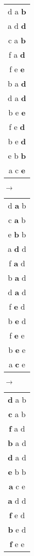 \documentclass[sigplan,10pt,anonymous,review]{thesis}
\begin{document}
\begin{figure}[!hb]
  \centering
  \begin{tt}
    \begin{tabular}{c}
      d a \textbf{b} \\
      a d \textbf{d} \\
      c a \textbf{b} \\
      f a \textbf{d} \\
      f e \textbf{e} \\
      b a \textbf{d} \\
      d a \textbf{d} \\
      b e \textbf{e} \\
      f e \textbf{d} \\
      b e \textbf{d} \\
      e b \textbf{b} \\
      a c \textbf{e}
    \end{tabular}
    $\rightarrow$
    \begin{tabular}{c}
      d \textbf{a} b \\
      c \textbf{a} b \\
      e \textbf{b} b \\
      a \textbf{d} d \\
      f \textbf{a} d \\
      b \textbf{a} d \\
      d \textbf{a} d \\
      f \textbf{e} d \\
      b \textbf{e} d \\
      f \textbf{e} e \\
      b \textbf{e} e \\
      a \textbf{c} e
    \end{tabular}
    $\rightarrow$
    \begin{tabular}{c}
      \textbf{d} a b \\
      \textbf{c} a b \\
      \textbf{f} a d \\
      \textbf{b} a d \\
      \textbf{d} a d \\
      \textbf{e} b b \\
      \textbf{a} c e \\
      \textbf{a} d d \\
      \textbf{f} e d \\
      \textbf{b} e d \\
      \textbf{f} e e \\

\end{tabular}
\end{tt}
\end{figure}
\end{document}

